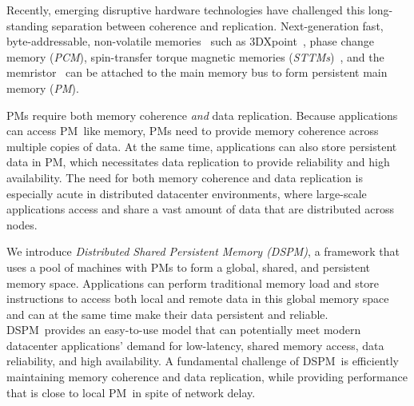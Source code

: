 \documentclass[sigconf]{acmart}
\renewcommand{\em}{\it}
\newcommand{\dsnvm}{DSPM}
\newcommand{\nvm}{PM}
\begin{document}

Recently, emerging disruptive hardware technologies have challenged this long-standing separation between coherence and replication.
Next-generation fast, byte-addressable, non-volatile memories~\cite{NVMDB}
such as 3DXpoint~\cite{Intel3DXpoint}, phase change memory ({\em PCM}),
spin-transfer torque magnetic memories ({\em STTMs})~\cite{SamsungSTTM}, and the memristor~\cite{HP-TheMachine}
can be attached to the main memory bus to form persistent main memory ({\em \nvm}).

\nvm{}s require both memory coherence {\em and} data replication.
Because applications can access \nvm\ like memory, \nvm{}s need to provide memory coherence across multiple copies of data.
At the same time, applications can also store persistent data in \nvm, 
which necessitates data replication to provide reliability and high availability.
The need for both memory coherence and data replication is especially 
acute in distributed datacenter environments, where large-scale applications
access and share a vast amount of data that are distributed across nodes.

We introduce {\em Distributed Shared Persistent Memory (\dsnvm)}, 
a framework that uses a pool of machines with \nvm{}s to form a global, shared, and persistent memory space.
Applications can perform traditional memory load and store instructions to access both local and remote data in this global memory space 
and can at the same time make their data persistent and reliable.
\dsnvm\ provides an easy-to-use model that can potentially meet modern datacenter applications' demand for low-latency, shared memory access, data reliability, and high availability. 
A fundamental challenge of \dsnvm\ is efficiently maintaining memory coherence and
data replication, while providing performance that is close to local \nvm\ in spite of network delay.
\end{document}
